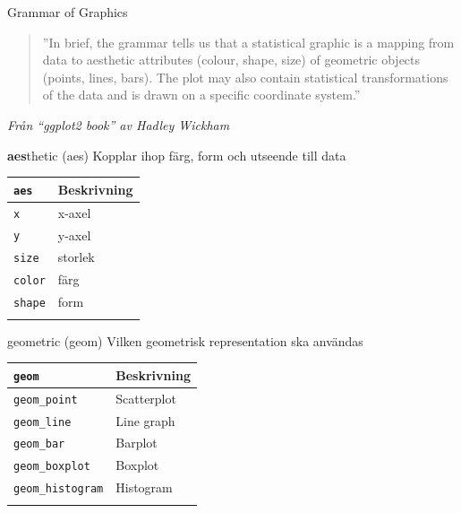 \documentclass[
  11pt,
  ignorenonframetext,
  handout]{beamer}
\newcounter{none} %
\begin{document}
\begin{frame}{Grammar of Graphics}
\protect{}\label{grammar-of-graphics-1}
\begin{quote}
''In brief, the grammar tells us that a statistical graphic is a mapping
from data to aesthetic attributes (colour, shape, size) of geometric
objects (points, lines, bars). The plot may also contain statistical
transformations of the data and is drawn on a specific coordinate
system.''
\end{quote}

\emph{Från ``ggplot2 book'' av Hadley Wickham}
\end{frame}

\begin{frame}[fragile]{\textbf{aes}thetic (aes)}
\protect{}\label{aesthetic-aes}
Kopplar ihop färg, form och utseende till data

{\def\LTcaptype{none} %
\begin{longtable}[]{@{}ll@{}}
\toprule\noalign{}
\texttt{aes} & Beskrivning \\
\midrule\noalign{}
\endhead
\texttt{x} & x-axel \\
\texttt{y} & y-axel \\
\texttt{size} & storlek \\
\texttt{color} & färg \\
\texttt{shape} & form \\
\bottomrule\noalign{}
\end{longtable}
}
\end{frame}

\begin{frame}[fragile]{geometric (geom)}
\protect{}\label{geometric-geom}
Vilken geometrisk representation ska användas

{\def\LTcaptype{none} %
\begin{longtable}[]{@{}ll@{}}
\toprule\noalign{}
\texttt{geom} & Beskrivning \\
\midrule\noalign{}
\endhead
\texttt{geom\_point} & Scatterplot \\
\texttt{geom\_line} & Line graph \\
\texttt{geom\_bar} & Barplot \\
\texttt{geom\_boxplot} & Boxplot \\
\texttt{geom\_histogram} & Histogram \\
\bottomrule\noalign{}
\end{longtable}
}
\end{frame}
\end{document}
